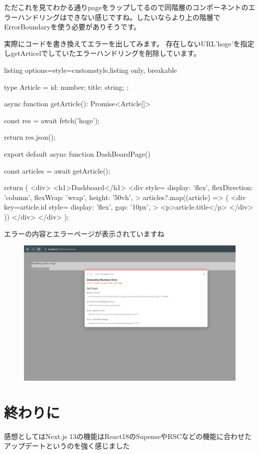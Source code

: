 ただこれを見てわかる通りpageをラップしてるので同階層のコンポーネントのエラーハンドリングはできない感じですね。したいならより上の階層でErrorBoundaryを使う必要がありそうです。

実際にコードを書き換えてエラーを出してみます。
存在しないURL'hoge'を指定しgetArticelでしていたエラーハンドリングを削除しています。


\begin{tcblisting}{listing options={style=customstyle},listing only, breakable}

  type Article = {
  id: number;
  title: string;
  };

  async function getArticle(): Promise<Article[]> {
      const res = await fetch('hoge');

      return res.json();
    }

  export default async function DashBoardPage() {
  const articles = await getArticle();

  return (
  <div>
  <h1>Dashboard</h1>
  <div
  style={{
      display: 'flex',
      flexDirection: 'column',
      flexWrap: 'wrap',
      height: '50vh',
    }}
  >
  {articles?.map((article) => (
  <div
  key={article.id}
  style={{
      display: 'flex',
      gap: '10px',
    }}
  >
    <p>{article.title}</p>
  </div>
  ))}
  </div>
  </div>
  );
  }

\end{tcblisting}


エラーの内容とエラーページが表示されていますね


\begin{figure}[H]
  \centering
  \includegraphics[width=12cm]{./image/03-Tech/chap4/08.png}
\end{figure}



\section{終わりに}
感想としてはNext.js 13の機能はReact18のSupenseやRSCなどの機能に合わせたアップデートというのを強く感じました